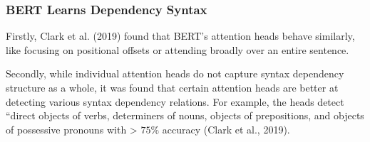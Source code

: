 \subsubsection{BERT Learns Dependency Syntax} \label{sec:BERTLearnsSyntax}

Firstly, Clark et al. (2019) found that BERT's attention heads behave similarly, like focusing on positional offsets or attending broadly over an entire sentence. 

Secondly, while individual attention heads do not capture syntax dependency structure as a whole, it was found that certain attention heads are better at detecting various syntax dependency relations. For example, the heads detect ``direct objects of verbs, determiners of nouns, objects of prepositions, and objects of possessive pronouns with > $75 \%$ accuracy (Clark et al., 2019). 

